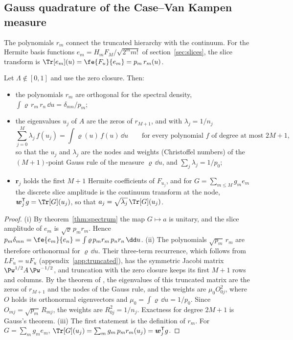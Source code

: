 \subsection{Gauss quadrature of the Case--Van Kampen measure}\label{tr:gausssec}

The polynomials $r_m$ connect the truncated hierarchy with the continuum. For the Hermite basis functions $e_m=H_mF_M/\sqrt{2^mm!}$ of section~\ref{sec:slices}, the slice transform is $\Tr[e_m](u)=\fe{F_u}{e_m}=p_m\,r_m(u)$.

\begin{proposition}\label{tr:gaussprop}
Let $\Lambda\notin[0,1]$ and use the zero closure. Then:
\begin{itemize}
\item[(i)] the polynomials $r_m$ are orthogonal for the spectral density, $\int\varrho\,r_m\,r_n\,\dd u=\delta_{mn}/p_m$;
\item[(ii)] the eigenvalues $u_j$ of $A$ are the zeros of $r_{M+1}$, and with $\lambda_j=1/n_j$
\begin{equation}\label{eq:gauss}
  \sum_{j=0}^M\lambda_j\,f(u_j)=\int\varrho(u)\,f(u)\,\dd u\qquad\text{for every polynomial $f$ of degree at most $2M+1$,}
\end{equation}
so that the $u_j$ and $\lambda_j$ are the nodes and weights (Christoffel numbers) of the $(M+1)$-point Gauss rule of the measure $\varrho\,\dd u$, and $\sum_j\lambda_j=1/p_0$;
\item[(iii)] $\boldsymbol r_j$ holds the first $M+1$ Hermite coefficients of $F_{u_j}$, and for $G=\sum_{m\le M}g_me_m$ the discrete slice amplitude is the continuum transform at the node, $\boldsymbol w_j^{\mathsf T}g=\Tr[G](u_j)$, so that $a_j=\sqrt{\lambda_j}\,\Tr[G](u_j)$.
\end{itemize}
\end{proposition}

\begin{proof}
(i) By theorem~\ref{thm:spectrum} the map $G\mapsto a$ is unitary, and the slice amplitude of $e_m$ is $\sqrt\varrho\,p_mr_m$. Hence $p_m\delta_{mn}=\fe{e_m}{e_n}=\int\varrho\,p_mr_m\,p_nr_n\,\dd u$. (ii) The polynomials $\sqrt{p_m}\,r_m$ are therefore orthonormal for $\varrho\,\dd u$. Their three-term recurrence, which follows from $LF_u=uF_u$ (appendix~\ref{app:truncated}), has the symmetric Jacobi matrix $\Pw^{1/2}A\,\Pw^{-1/2}$, and truncation with the zero closure keeps its first $M+1$ rows and columns. By the theorem of \citet{GolubWelsch1969}, the eigenvalues of this truncated matrix are the zeros of $r_{M+1}$ and the nodes of the Gauss rule, and the weights are $\mu_0O_{0j}^2$, where $O$ holds its orthonormal eigenvectors and $\mu_0=\int\varrho\,\dd u=1/p_0$. Since $O_{mj}=\sqrt{p_m}\,R_{mj}$, the weights are $R_{0j}^2=1/n_j$. Exactness for degree $2M+1$ is Gauss's theorem. (iii) The first statement is the definition of $r_m$. For $G=\sum_mg_me_m$, $\Tr[G](u_j)=\sum_mg_m\,p_mr_m(u_j)=\boldsymbol w_j^{\mathsf T}g$.
\end{proof}

